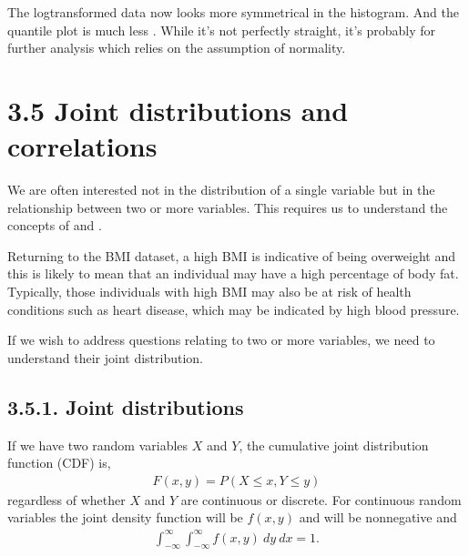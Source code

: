 \documentclass[letterpaper,10pt,english]{jupyterBook}
\begin{document}
\sphinxAtStartPar
The log\sphinxhyphen{}transformed data now looks more symmetrical in the histogram. And the quantile plot is much less . While it’s not perfectly straight, it’s probably  for further analysis which relies on the assumption of normality.


\section{3.5 Joint distributions and correlations}
\label{\detokenize{03.f. Continuous Probability Distributions:joint-distributions-and-correlations}}\label{\detokenize{03.f. Continuous Probability Distributions::doc}}
\sphinxAtStartPar
We are often interested not in the distribution of a single variable but in the relationship between two or more variables. This requires us to understand the concepts of  and .

\sphinxAtStartPar
Returning to the BMI dataset, a high BMI is indicative of being overweight and this is likely to mean that an individual may have a high percentage of body fat. Typically, those individuals with high BMI may also be at risk of health conditions such as heart disease, which may be indicated by high blood pressure.

\sphinxAtStartPar
If we wish to address questions relating to two or more variables, we need to understand their joint distribution.


\subsection{3.5.1. Joint distributions}
\label{\detokenize{03.f. Continuous Probability Distributions:joint-distributions}}
\sphinxAtStartPar
If we have two random variables \(X\) and \(Y\), the cumulative joint distribution function (CDF) is,
\begin{equation*}
\begin{split}F(x,y) = P(X \leq x,Y \leq y)\end{split}
\end{equation*}
\sphinxAtStartPar
regardless of whether \(X\) and \(Y\) are continuous or discrete. For continuous random variables the joint density function will be \(f(x,y)\) and will be non\sphinxhyphen{}negative and
\begin{equation*}
\begin{split}\int_{-\infty}^{\infty} \int_{-\infty}^{\infty} f(x,y)\: dy\: dx = 1.\end{split}
\end{equation*}
\end{document}
